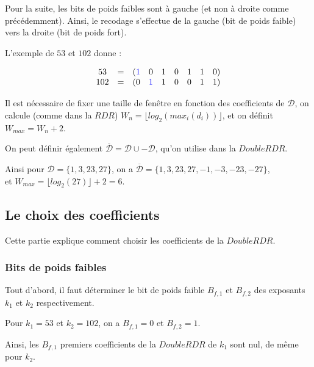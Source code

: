 \documentclass[12pt, a4paper]{memoir}
\newcommand{\dbarre}{\overline{\mathcal{D}}}
\begin{document}
 
 Pour la suite, les bits de poids faibles sont à gauche (et non à droite comme précédemment).
 Ainsi, le recodage s'effectue de la gauche (bit de poids faible) vers la droite (bit de poids fort).
 
 L'exemple de $53$ et $102$ donne :
 
  $$\begin{array}{ccccccccc}
  53 & = & (\textcolor{blue}{1} & 0 & 1 & 0 & 1 & 1 & 0) \\
  102 & = & (0 & \textcolor{blue}{1} & 1 & 0 & 0 & 1 & 1)
 \end{array}$$
 
   Il est nécessaire de fixer une taille de fenêtre en fonction des coefficients de $\mathcal{D}$, on calcule
   (comme dans la $RDR$) $W_n = \lfloor log_2(max_i(d_i)) \rfloor$, et on définit $W_{max} = W_n + 2$.
   
   On peut définir également $\dbarre = \mathcal{D} \cup -\mathcal{D}$, qu'on utilise dans la $DoubleRDR$.

   Ainsi pour $\mathcal{D} = \{1,3,23,27\}$, on a $\dbarre = \{1,3,23,27,-1,-3,-23,-27\}$, \\
   et $W_{max} = \lfloor log_2(27) \rfloor + 2 = 6$.

 
 \subsection{Le choix des coefficients}

 Cette partie explique comment choisir les coefficients de la $DoubleRDR$.
 
 \subsubsection{Bits de poids faibles}
 
 Tout d'abord, il faut déterminer le  bit de poids faible $B_{f,1}$ et $B_{f,2}$ des exposants $k_1$ et $k_2$ 
 respectivement. 
 
 Pour $k_1 = 53$ et $k_2 = 102$, on a $B_{f,1} = 0$ et $B_{f,2} = 1$.
 
 Ainsi, les $B_{f,1}$ premiers coefficients de la $DoubleRDR$ de $k_1$ sont nul, de même pour $k_2$.
 
\end{document}
